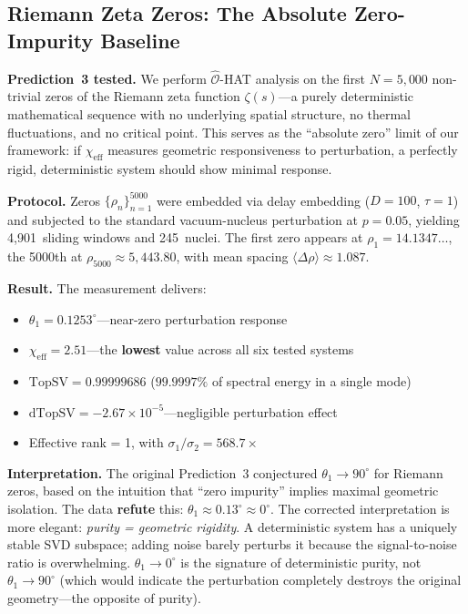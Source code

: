 \documentclass[aps,prl,twocolumn,superscriptaddress,byrevtex]{article}
\begin{document}
\subsection{Riemann Zeta Zeros: The Absolute Zero-Impurity Baseline}

\textbf{Prediction~3 tested.} We perform $\hat{\mathcal{O}}$-HAT analysis on the first $N=5,\!000$ non-trivial zeros of the Riemann zeta function $\zeta(s)$---a purely deterministic mathematical sequence with no underlying spatial structure, no thermal fluctuations, and no critical point. This serves as the ``absolute zero'' limit of our framework: if $\chi_{\text{eff}}$ measures geometric responsiveness to perturbation, a perfectly rigid, deterministic system should show minimal response.

\textbf{Protocol.} Zeros $\{\rho_n\}_{n=1}^{5000}$ were embedded via delay embedding ($D=100$, $\tau=1$) and subjected to the standard vacuum-nucleus perturbation at $p=0.05$, yielding 4,901~sliding windows and 245~nuclei. The first zero appears at $\rho_1 = 14.1347\ldots$, the 5000th at $\rho_{5000} \approx 5,\!443.80$, with mean spacing $\langle\Delta\rho\rangle \approx 1.087$.

\textbf{Result.} The measurement delivers:
\begin{itemize}
\item $\theta_1 = 0.1253^\circ$---near-zero perturbation response
\item $\chi_{\text{eff}} = 2.51$---the \textbf{lowest} value across all six tested systems
\item $\text{TopSV} = 0.99999686$ ($99.9997\%$ of spectral energy in a single mode)
\item $\text{dTopSV} = -2.67 \times 10^{-5}$---negligible perturbation effect
\item Effective rank = 1, with $\sigma_1/\sigma_2 = 568.7\times$
\end{itemize}

\textbf{Interpretation.} The original Prediction~3 conjectured $\theta_1 \to 90^\circ$ for Riemann zeros, based on the intuition that ``zero impurity'' implies maximal geometric isolation. The data \textbf{refute} this: $\theta_1 \approx 0.13^\circ \approx 0^\circ$. The corrected interpretation is more elegant: \emph{purity = geometric rigidity}. A deterministic system has a uniquely stable SVD subspace; adding noise barely perturbs it because the signal-to-noise ratio is overwhelming. $\theta_1 \to 0^\circ$ is the signature of deterministic purity, not $\theta_1 \to 90^\circ$ (which would indicate the perturbation completely destroys the original geometry---the opposite of purity).
\end{document}
